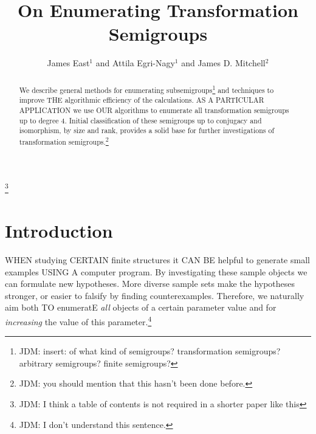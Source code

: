 \documentclass{amsart}
\theoremstyle{plain}
\theoremstyle{definition}
\begin{document}
\title{On Enumerating Transformation Semigroups}
\author[J. East, A. Egri-Nagy, J.D. Mitchell]{James East$^1$ and Attila Egri-Nagy$^{1}$ and James D. Mitchell$^2$}
\address{$^1$Centre for Research in Mathematics, School of Computing, Engineering and Mathematics, University of Western Sydney (Parramatta Campus), Locked Bag 1797, Penrith, NSW 2751, Australia}
\address{$^2$ Mathematical Institute, University of St Andrews, North Haugh, St Andrews, Fife, KY16 9SS, Scotland}
\maketitle
\begin{abstract}
  We describe general methods for enumerating subsemigroups\footnote{JDM:
    insert: of what kind of semigroups? transformation semigroups? arbitrary
  semigroups? finite semigroups?} and techniques to improve THE algorithmic efficiency of the calculations.
AS A PARTICULAR APPLICATION we use OUR algorithms to enumerate all transformation semigroups up to degree 4.
Initial classification of these semigroups up to conjugacy and isomorphism, by
size and rank, provides a solid base for further investigations of
transformation semigroups.\footnote{JDM: you should mention that this hasn't
been done before.}
\end{abstract}
\tableofcontents
\footnote{JDM: I think a table of contents is not required in a shorter paper
like this}
\section{Introduction}
WHEN studying CERTAIN finite structures it CAN BE helpful to generate small
examples USING A computer program.
By investigating these sample objects we can formulate new hypotheses.
More diverse sample sets make the hypotheses stronger, or easier to falsify by finding counterexamples.
Therefore, we naturally aim both TO enumeratE \emph{all} objects of a certain
parameter value and for \emph{increasing} the value of this
parameter.\footnote{JDM: I don't understand this sentence.}
\end{document}
